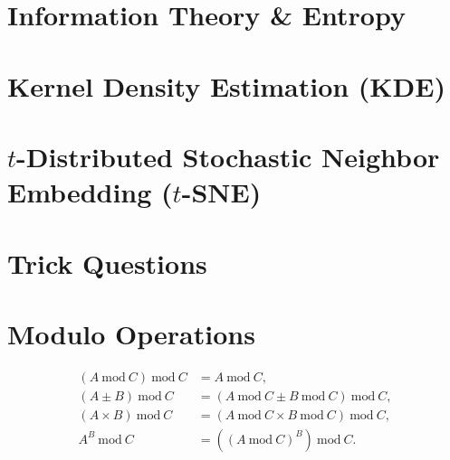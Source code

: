 \section{Information Theory \& Entropy}
\label{misc:info_theory}

\section{Kernel Density Estimation (KDE)}
\label{misc:KDE}

\section{\texorpdfstring{$t$}{t}-Distributed Stochastic Neighbor Embedding (\texorpdfstring{$t$}{t}-SNE)}
\label{misc:tSNE}

\section{Trick Questions}
\label{misc:trick}

\section{Modulo Operations}
\label{misc:modulo}

\begin{subequations}\label{eq:misc:modulo}
\begin{align}
\left(A~\text{mod}~C\right)~\text{mod}~C &= A~\text{mod}~C, \label{eq:misc:modulo:basic} \\
\left(A \pm B\right)~\text{mod}~C &= \left(A~\text{mod}~C \pm B~\text{mod}~C\right)~\text{mod}~C, \label{eq:misc:modulo:pm} \\
\left(A \times B\right)~\text{mod}~C &= \left(A~\text{mod}~C \times B~\text{mod}~C\right)~\text{mod}~C, \label{eq:misc:modulo:multiplication} \\
A^{B}~\text{mod}~C &= \left(\left(A~\text{mod}~C\right)^{B}\right)~\text{mod}~C. \label{eq:misc:modulo:exp}
\end{align}
\end{subequations}

